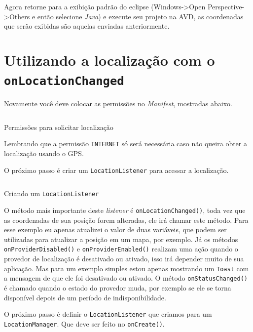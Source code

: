 \documentclass[a4paper,12pt,brazil,oneside]{book}
\begin{document}
		Agora retorne para a exibição padrão do eclipse (Windows->Open Perspective->Others e então selecione \emph{Java}) e execute seu projeto na AVD, as coordenadas que serão exibidas são aquelas enviadas anteriormente. 

	
		\section{Utilizando a localização com o \texttt{onLocationChanged}}		

		Novamente você deve colocar as permissões no \emph{Manifest}, mostradas abaixo.

		\begin{listing}[H]
		\inputminted[linenos=true,fontsize=\small,frame=lines, framesep=2mm, tabsize=2,numbersep=5pt]{xml}{src/api/maps/perm1.xml}
		\caption{Permissões para solicitar localização}
		\label{code:locationperm}
		\end{listing} 		

		Lembrando que a permissão \texttt{INTERNET} só será necessária caso não queira obter a localização usando o GPS.

		O próximo passo é criar um \texttt{LocationListener} para acessar a localização.

		\begin{listing}[H]
		\inputminted[linenos=true,fontsize=\small,frame=lines, framesep=2mm, tabsize=2,numbersep=5pt]{java}{src/api/maps/listener.java}
		\caption{Criando um \texttt{LocationListener}}
		\label{code:locationlistener}
		\end{listing} 	

		O método mais importante deste \emph{listener} é \texttt{onLocationChanged()}, toda vez que as coordenadas de sua posição forem alteradas, ele irá chamar este método. Para esse exemplo eu apenas atualizei o valor de duas variáveis, que podem ser utilizadas para atualizar a posição em um mapa, por exemplo. Já os métodos \texttt{onProviderDisabled()} e \texttt{onProviderEnabled()} realizam uma ação quando o provedor de localização é desativado ou ativado, isso irá depender muito de sua aplicação. Mas para um exemplo simples estou apenas mostrando um \texttt{Toast} com a mensagem de que ele foi desativado ou ativado. O método \texttt{onStatusChanged()} é chamado quando o estado do provedor muda, por exemplo se ele se torna disponível depois de um período de indisponibilidade.

		O próximo passo é definir o \texttt{LocationListener} que criamos para um \texttt{LocationManager}. Que deve ser feito no \texttt{onCreate()}.
\end{document}
